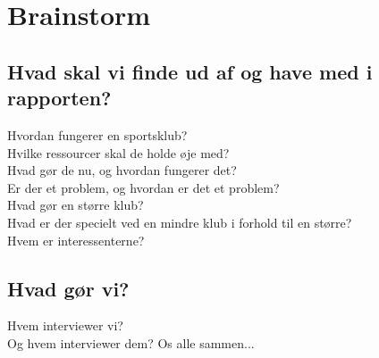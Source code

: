 \chapter{Brainstorm}\label{ch:ch2label}


\section{Hvad skal vi finde ud af og have med i rapporten?}
Hvordan fungerer en sportsklub?\\
Hvilke ressourcer skal de holde øje med?\\
Hvad gør de nu, og hvordan fungerer det?\\
Er der et problem, og hvordan er det et problem?\\
Hvad gør en større klub?\\
Hvad er der specielt ved en mindre klub i forhold til en større?\\
Hvem er interessenterne?\\

\section{Hvad gør vi?}
Hvem interviewer vi?\\
Og hvem interviewer dem? Os alle sammen...\\

















